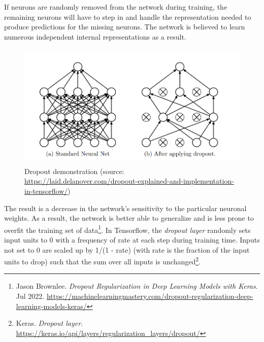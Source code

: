 If neurons are randomly removed from the network during training, the remaining neurons will have to step in and handle the representation needed to produce predictions for the missing neurons. The network is believed to learn numerous independent internal representations as a result.
\begin{figure}[!h]
	\centering
	\includegraphics[width=\linewidth, height=6cm,keepaspectratio]{figures/dropout.png}
   \caption{Dropout demonstration (source: \url{https://laid.delanover.com/dropout-explained-and-implementation-in-tensorflow/})}
\end{figure}

The result is a decrease in the network's sensitivity to the particular neuronal weights. As a result, the network is better able to generalize and is less prone to overfit the training set of data\footnote{
	Jason Brownlee. \textit{Dropout Regularization in Deep Learning Models with Keras}. Jul 2022. \url{https://machinelearningmastery.com/dropout-regularization-deep-learning-models-keras/}
}.
In Tensorflow, the \emph{dropout layer} randomly sets input units to 0 with a frequency of rate
at each step during training time. Inputs not set to 0 are scaled up by 1/(1 - rate)  (with rate is the fraction of the input units to drop) such that the sum over all inputs is unchanged\footnote{Keras. \textit{Dropout layer}. \url{https://keras.io/api/layers/regularization_layers/dropout/}}.

